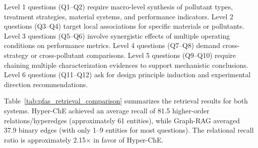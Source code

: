 \documentclass[11pt,a4paper]{article}
\begin{document}
Level 1 questions (Q1--Q2) require macro-level synthesis of pollutant types, treatment strategies, material systems, and performance indicators. Level 2 questions (Q3--Q4) target local associations for specific materials or pollutants. Level 3 questions (Q5--Q6) involve synergistic effects of multiple operating conditions on performance metrics. Level 4 questions (Q7--Q8) demand cross-strategy or cross-pollutant comparisons. Level 5 questions (Q9--Q10) require chaining multiple characterization evidences to support mechanistic conclusions. Level 6 questions (Q11--Q12) ask for design principle induction and experimental direction recommendations.

Table~\ref{tab:pfas_retrieval_comparison} summarizes the retrieval results for both systems. Hyper-ChE achieved an average recall of 81.5 higher-order relations/hyperedges (approximately 61 entities), while Graph-RAG averaged 37.9 binary edges (with only 1--9 entities for most questions). The relational recall ratio is approximately 2.15$\times$ in favor of Hyper-ChE.
\end{document}
